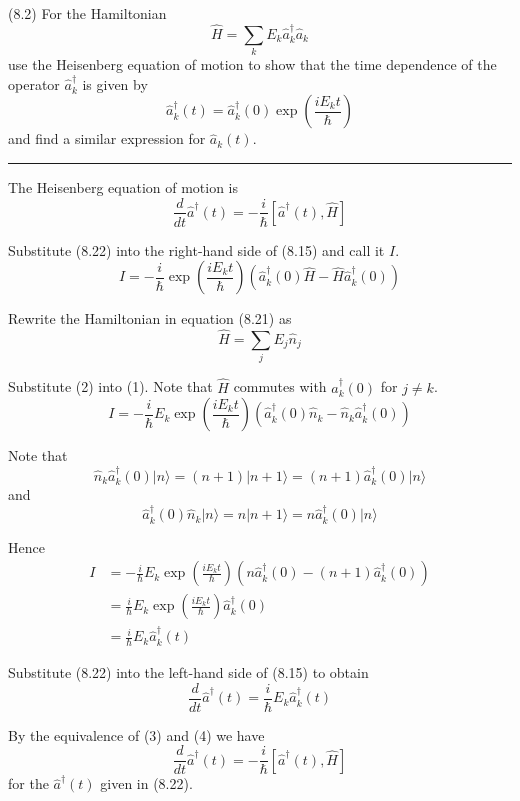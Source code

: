 \documentclass[12pt]{article}
\begin{document}
(8.2)
For the Hamiltonian
\begin{equation*}
\hat H=\sum_kE_k\hat a_k^\dag\hat a_k
\tag{8.21}
\end{equation*}
use the Heisenberg equation of motion to show that
the time dependence of the operator $\hat a_k^\dag$ is given by
\begin{equation*}
\hat a_k^\dag(t)=\hat a_k^\dag(0)\exp\left(\frac{iE_kt}{\hbar}\right)
\tag{8.22}
\end{equation*}
and find a similar expression for $\hat a_k(t)$.

\bigskip
\hrule

\bigskip
The Heisenberg equation of motion is
\begin{equation*}
\frac{d}{dt}\hat a^\dag(t)=-\frac{i}{\hbar}\left[\hat a^\dag(t),\hat H\right]
\tag{8.15}
\end{equation*}

Substitute (8.22) into the right-hand side of (8.15) and call it $I$.
\begin{equation*}
I=-\frac{i}{\hbar}\exp\left(\frac{iE_kt}{\hbar}\right)
\left(\hat a_k^\dag(0)\hat H-\hat H\hat a_k^\dag(0)\right)
\tag{1}
\end{equation*}

Rewrite the Hamiltonian in equation (8.21) as
\begin{equation*}
\hat H=\sum_jE_j\hat n_j
\tag{2}
\end{equation*}

Substitute (2) into (1). Note that $\hat H$ commutes with $\hat a_k^\dag(0)$ for $j\ne k$.
\begin{equation*}
I=-\frac{i}{\hbar}E_k\exp\left(\frac{iE_kt}{\hbar}\right)
\left(\hat a_k^\dag(0)\hat n_k-\hat n_k\hat a_k^\dag(0)\right)
\end{equation*}

Note that
\begin{equation*}
\hat n_k\hat a_k^\dag(0)|n\rangle=(n+1)|n+1\rangle=(n+1)\hat a_k^\dag(0)|n\rangle
\end{equation*}
and
\begin{equation*}
\hat a_k^\dag(0)\hat n_k|n\rangle=n|n+1\rangle=n\hat a_k^\dag(0)|n\rangle
\end{equation*}

Hence
\begin{align*}
I&=-\frac{i}{\hbar}E_k\exp\left(\frac{iE_kt}{\hbar}\right)
\left(n\hat a_k^\dag(0)-(n+1)\hat a_k^\dag(0)\right)
\\
&=\frac{i}{\hbar}E_k\exp\left(\frac{iE_kt}{\hbar}\right)\hat a_k^\dag(0)
\\
&=\frac{i}{\hbar}E_k\hat a_k^\dag(t)
\tag{3}
\end{align*}

Substitute (8.22) into the left-hand side of (8.15) to obtain
\begin{equation*}
\frac{d}{dt}\hat a^\dag(t)=\frac{i}{\hbar}E_k\hat a_k^\dag(t)
\tag{4}
\end{equation*}

By the equivalence of (3) and (4) we have
\begin{equation*}
\frac{d}{dt}\hat a^\dag(t)=-\frac{i}{\hbar}\left[\hat a^\dag(t),\hat H\right]
\end{equation*}
for the $\hat a^\dag(t)$ given in (8.22).
\end{document}
